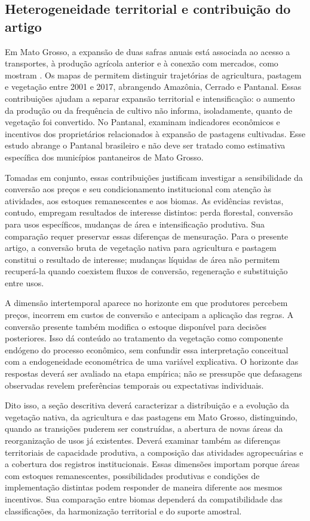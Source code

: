 \subsection{Heterogeneidade territorial e contribuição do artigo}

Em Mato Grosso, a expansão de duas safras anuais está associada ao acesso a transportes, à produção agrícola anterior e à conexão com mercados, como mostram . Os mapas de  permitem distinguir trajetórias de agricultura, pastagem e vegetação entre 2001 e 2017, abrangendo Amazônia, Cerrado e Pantanal. Essas contribuições ajudam a separar expansão territorial e intensificação: o aumento da produção ou da frequência de cultivo não informa, isoladamente, quanto de vegetação foi convertido. No Pantanal,  examinam indicadores econômicos e incentivos dos proprietários relacionados à expansão de pastagens cultivadas. Esse estudo abrange o Pantanal brasileiro e não deve ser tratado como estimativa específica dos municípios pantaneiros de Mato Grosso.

Tomadas em conjunto, essas contribuições justificam investigar a sensibilidade da conversão aos preços e seu condicionamento institucional com atenção às atividades, aos estoques remanescentes e aos biomas. As evidências revistas, contudo, empregam resultados de interesse distintos: perda florestal, conversão para usos específicos, mudanças de área e intensificação produtiva. Sua comparação requer preservar essas diferenças de mensuração. Para o presente artigo, a conversão bruta de vegetação nativa para agricultura e pastagem constitui o resultado de interesse; mudanças líquidas de área não permitem recuperá-la quando coexistem fluxos de conversão, regeneração e substituição entre usos.

A dimensão intertemporal aparece no horizonte em que produtores percebem preços, incorrem em custos de conversão e antecipam a aplicação das regras. A conversão presente também modifica o estoque disponível para decisões posteriores. Isso dá conteúdo ao tratamento da vegetação como componente endógeno do processo econômico, sem confundir essa interpretação conceitual com a endogeneidade econométrica de uma variável explicativa. O horizonte das respostas deverá ser avaliado na etapa empírica; não se pressupõe que defasagens observadas revelem preferências temporais ou expectativas individuais.

Dito isso, a seção descritiva deverá caracterizar a distribuição e a evolução da vegetação nativa, da agricultura e das pastagens em Mato Grosso, distinguindo, quando as transições puderem ser construídas, a abertura de novas áreas da reorganização de usos já existentes. Deverá examinar também as diferenças territoriais de capacidade produtiva, a composição das atividades agropecuárias e a cobertura dos registros institucionais. Essas dimensões importam porque áreas com estoques remanescentes, possibilidades produtivas e condições de implementação distintas podem responder de maneira diferente aos mesmos incentivos. Sua comparação entre biomas dependerá da compatibilidade das classificações, da harmonização territorial e do suporte amostral.

